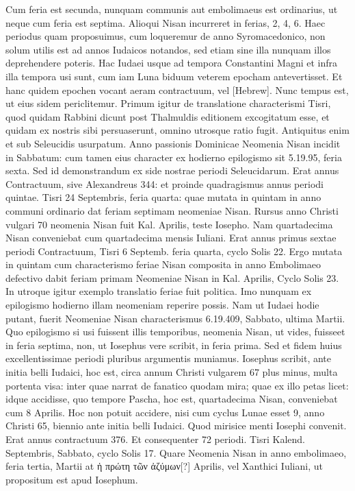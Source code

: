 Cum feria est secunda, nunquam
communis aut embolimaeus est ordinarius, ut neque cum feria
est septima.
Alioqui Nisan incurreret in ferias, 2, 4, 6.
Haec periodus
quam proposuimus, cum loqueremur de anno Syromacedonico, non
solum utilis est ad annos Iudaicos notandos, sed etiam sine illa nunquam
illos deprehendere poteris.
Hac Iudaei usque ad tempora Constantini
Magni et infra illa tempora usi sunt, cum iam Luna biduum
veterem epocham antevertisset.
Et hanc quidem epochen vocant
aeram contractuum, vel \texthebrew{[Hebrew]}.
Nunc tempus est, ut eius sidem periclitemur.
Primum igitur de translatione characterismi Tisri, quod
quidam Rabbini dicunt post Thalmuldis editionem excogitatum esse,
et quidam ex nostris sibi persuaserunt, omnino utrosque ratio fugit.
Antiquitus enim et sub Seleucidis usurpatum.
Anno passionis Dominicae
Neomenia Nisan incidit in Sabbatum: cum tamen eius character
ex hodierno epilogismo sit 5.19.95, feria sexta.
Sed id demonstrandum
ex side nostrae periodi Seleucidarum.
Erat annus Contractuum,
sive Alexandreus 344: et proinde quadragismus annus periodi
quintae. %
Tisri 24 Septembris, feria quarta: quae mutata in quintam
in anno communi ordinario dat feriam septimam neomeniae Nisan.
Rursus anno Christi vulgari 70 neomenia Nisan fuit Kal. %
 Aprilis, teste
Iosepho.
Nam quartadecima Nisan conveniebat cum quartadecima
mensis Iuliani.
Erat annus primus sextae periodi Contractuum, Tisri
6 Septemb. %
 feria quarta, cyclo Solis 22.
Ergo mutata in quintam
cum characterismo feriae Nisan composita in anno Embolimaeo defectivo
dabit feriam primam Neomeniae Nisan in Kal. %
 Aprilis, Cyclo
Solis 23.
In utroque igitur exemplo translatio feriae fuit politica.
Imo
nunquam ex epilogismo hodierno illam neomeniam reperire possis.
Nam ut Iudaei hodie putant, fuerit Neomeniae Nisan characterismus
6.19.409, Sabbato, ultima Martii.
Quo epilogismo si usi fuissent illis
temporibus, neomenia Nisan, ut vides, fuisseet in feria septima, non, ut
Iosephus vere scribit, in feria prima.
Sed et fidem huius excellentissimae
periodi pluribus argumentis muniamus.
Iosephus scribit, ante
initia belli Iudaici, hoc est, circa annum Christi vulgarem 67 plus minus,
multa portenta visa: inter quae narrat de fanatico quodam mira;
quae ex illo petas licet: idque accidisse, quo tempore Pascha, hoc est,
quartadecima Nisan, conveniebat cum 8 Aprilis.
Hoc non potuit accidere,
nisi cum cyclus Lunae esset 9, anno Christi 65, biennio ante initia
belli Iudaici.
Quod mirisice menti Iosephi convenit.
Erat annus
contractuum 376.
Et consequenter 72 periodi.
Tisri Kalend. %
 Septembris,
Sabbato, cyclo Solis 17.
Quare Neomenia Nisan in anno embolimaeo,
feria tertia, Martii  at \textgreek{ἡ πρώτη τῶν ἀζύμων[?]}
  Aprilis,
vel Xanthici Iuliani, ut propositum est apud Iosephum.

